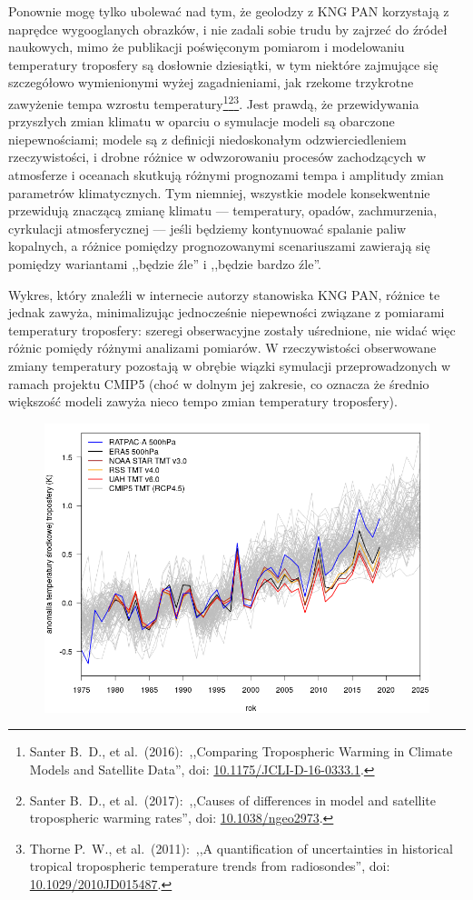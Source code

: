 \documentclass[12pt]{article}
\newcommand{\doi}[1]{doi: \href{htts://doi.org/#1}{#1}}
\begin{document}
Ponownie mogę tylko ubolewać nad tym, że geolodzy z KNG PAN korzystają z naprędce wygooglanych obrazków, i nie zadali sobie trudu by zajrzeć do źródeł naukowych, mimo że publikacji poświęconym pomiarom i modelowaniu temperatury troposfery są dosłownie dziesiątki, w tym niektóre zajmujące się szczegółowo wymienionymi wyżej zagadnieniami, jak rzekome trzykrotne zawyżenie tempa wzrostu temperatury\footnote{Santer B.~D., et al.~(2016):~,,Comparing Tropospheric Warming in Climate Models and Satellite Data'', \doi{10.1175/JCLI-D-16-0333.1}.}\footnote{Santer B.~D., et al.~(2017):~,,Causes of differences in model and satellite tropospheric warming rates'', \doi{10.1038/ngeo2973}.}\footnote{Thorne P.~W., et al.~(2011):~,,A quantification of uncertainties in historical tropical tropospheric temperature trends from radiosondes'', \doi{10.1029/2010JD015487}.}. Jest prawdą, że przewidywania przyszłych zmian klimatu w oparciu o symulacje modeli są obarczone niepewnościami; modele są z definicji niedoskonałym odzwierciedleniem rzeczywistości, i drobne różnice w odwzorowaniu procesów zachodzących w atmosferze i oceanach skutkują różnymi prognozami tempa i amplitudy zmian parametrów klimatycznych. Tym niemniej, wszystkie modele konsekwentnie przewidują znaczącą zmianę klimatu --- temperatury, opadów, zachmurzenia, cyrkulacji atmosferycznej --- jeśli będziemy kontynuować spalanie paliw kopalnych, a różnice pomiędzy prognozowanymi scenariuszami zawierają się pomiędzy wariantami ,,będzie źle'' i ,,będzie bardzo źle''.
		
Wykres, który znaleźli w internecie autorzy stanowiska KNG PAN, różnice te jednak zawyża, minimalizując jednocześnie niepewności związane z pomiarami temperatury troposfery: szeregi obserwacyjne zostały uśrednione, nie widać więc różnic pomiędy różnymi analizami pomiarów. W rzeczywistości obserwowane zmiany temperatury pozostają w obrębie wiązki symulacji przeprowadzonych w ramach projektu CMIP5 (choć w dolnym jej zakresie, co oznacza że średnio większość modeli zawyża nieco tempo zmian temperatury troposfery).

\begin{figure}
	\centering
	
	\includegraphics[width=.95\textwidth]{img/cmip5_tmt.png}
\end{figure}
		
\end{document}

